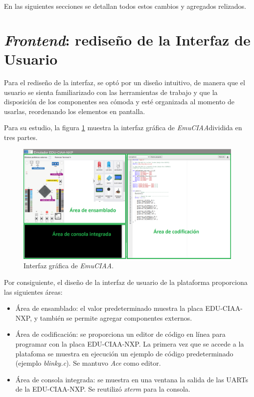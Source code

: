 En las siguientes secciones se detallan todos estos cambios y agregados relizados.

\section{\textit{Frontend}: rediseño de la Interfaz de Usuario}

Para el rediseño de la interfaz, se optó por un diseño intuitivo, de manera que el usuario se sienta familiarizado con las herramientas de trabajo y que la disposición de los componentes sea cómoda y esté organizada al momento de usarlas, reordenando los elementos en pantalla.

Para su estudio, la figura \ref{fig:PlataformaEmulador1} muestra la interfaz gráfica de \textit{EmuCIAA}dividida en tres partes.

\begin{figure}[ht]
	\centering
	\includegraphics[scale=.28]{./Figures/PlataformaEmulador.png}
	\caption{Interfaz gráfica de \textit{EmuCIAA}.}
	\label{fig:PlataformaEmulador1}
\end{figure}

Por consiguiente, el diseño de la interfaz de usuario de la plataforma proporciona las siguientes áreas:

\begin{itemize}
	\item Área de ensamblado: el valor predeterminado muestra la placa EDU-CIAA-NXP, y también se permite agregar componentes externos.
	\item Área de codificación: se proporciona un editor de código en línea para programar con la placa EDU-CIAA-NXP. La primera vez que se accede a la platafoma se muestra en ejecución un ejemplo de código predeterminado (ejemplo \textit{blinky.c}). Se mantuvo \textit{Ace} como editor.
	\item Área de consola integrada: se muestra en una ventana la salida de las UARTs de la EDU-CIAA-NXP. Se reutilizó \textit{xterm} para la consola.
\end{itemize}

